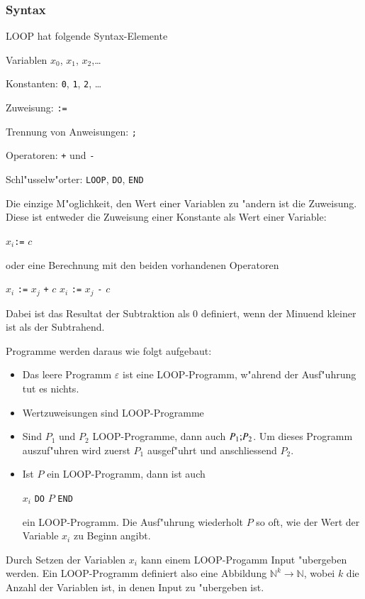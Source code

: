 \subsubsection{Syntax}
LOOP hat folgende Syntax-Elemente
\begin{compactitem}
\item Variablen $x_0$, $x_1$, $x_2$,\dots
\item Konstanten: {\tt 0}, {\tt 1}, {\tt 2}, \dots
\item Zuweisung: {\tt :=}
\item Trennung von Anweisungen: {\tt ;}
\item Operatoren: {\tt +} und {\tt -}
\item Schl"usselw"orter: {\tt LOOP}, {\tt DO}, {\tt END}
\end{compactitem}
Die einzige M"oglichkeit, den Wert einer Variablen zu "andern ist die
Zuweisung.  Diese ist entweder die Zuweisung einer Konstante als
Wert einer Variable:
\begin{algorithmic}
\STATE $x_i${\tt :=} $c$
\end{algorithmic}
oder eine Berechnung mit den beiden vorhandenen Operatoren
\begin{algorithmic}
\STATE $x_i$ {\tt :=} $x_j$ {\tt +} $c$
\STATE $x_i$ {\tt :=} $x_j$ {\tt -} $c$
\end{algorithmic}
Dabei ist das Resultat der Subtraktion als $0$ definiert, wenn
der Minuend kleiner ist als der Subtrahend.

Programme werden daraus wie folgt aufgebaut:
\begin{itemize}
\item Das leere Programm $\varepsilon$ ist eine LOOP-Programm,
w"ahrend der Ausf"uhrung tut es nichts.
\item Wertzuweisungen sind LOOP-Programme
\item Sind $P_1$ und $P_2$ LOOP-Programme, dann auch
$P_1{\tt ;}P_2$. Um dieses Programm auszuf"uhren wird zuerst $P_1$
ausgef"uhrt und anschliessend $P_2$.
\item Ist $P$ ein LOOP-Programm, dann ist auch
\begin{algorithmic}
 $x_i$ {\tt DO} $P$ {\tt END}
\end{algorithmic}
ein LOOP-Programm. Die Ausf"uhrung wiederholt $P$ so oft, wie der
Wert der Variable $x_i$  zu Beginn angibt.
\end{itemize}
Durch Setzen der Variablen $x_i$ kann einem LOOP-Progamm Input "ubergeben
werden.
Ein LOOP-Programm definiert also eine Abbildung $\mathbb N^k\to\mathbb N$,
wobei $k$ die Anzahl der Variablen ist, in denen Input zu "ubergeben ist.

